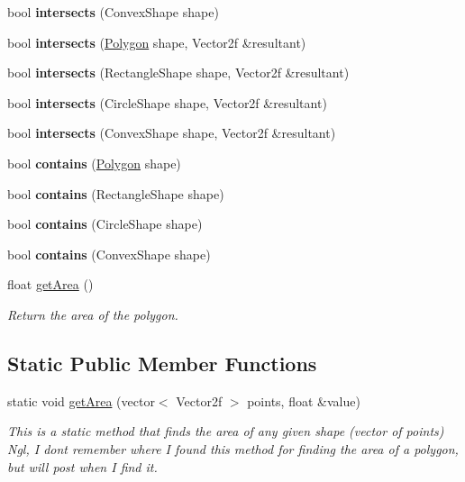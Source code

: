 \begin{DoxyCompactItemize}
bool {\bfseries intersects} (Convex\+Shape shape)
\item 
\mbox{\label{class_polygon_a713983b426b75523599e862924bca782}} 
bool {\bfseries intersects} (\mbox{\hyperlink{class_polygon}{Polygon}} shape, Vector2f \&resultant)
\item 
\mbox{\label{class_polygon_aa1af5f5482999785aed533d16279c67b}} 
bool {\bfseries intersects} (Rectangle\+Shape shape, Vector2f \&resultant)
\item 
\mbox{\label{class_polygon_a874be1c28a2a1477d1ea5d85ece74822}} 
bool {\bfseries intersects} (Circle\+Shape shape, Vector2f \&resultant)
\item 
\mbox{\label{class_polygon_ab7fb23f4dbf6277688c4fb11f0a5938f}} 
bool {\bfseries intersects} (Convex\+Shape shape, Vector2f \&resultant)
\item 
\mbox{\label{class_polygon_a1501a824c6d97ce3ef8efc5443ab1f8e}} 
bool {\bfseries contains} (\mbox{\hyperlink{class_polygon}{Polygon}} shape)
\item 
\mbox{\label{class_polygon_a1712cd82ff38472dd9ba87f0f8b37a9f}} 
bool {\bfseries contains} (Rectangle\+Shape shape)
\item 
\mbox{\label{class_polygon_a60fe86ef61eeb9903a8eef32870ea1c4}} 
bool {\bfseries contains} (Circle\+Shape shape)
\item 
\mbox{\label{class_polygon_aea5d69a1006a0b6b08dbc3e236b302ea}} 
bool {\bfseries contains} (Convex\+Shape shape)
\item 
float \mbox{\hyperlink{class_polygon_a00dc79655e7be6b73a83414a6733ec9a}{get\+Area}} ()
\begin{DoxyCompactList}\small\item\em Return the area of the polygon. \end{DoxyCompactList}\end{DoxyCompactItemize}
\subsection*{Static Public Member Functions}
\begin{DoxyCompactItemize}
\item 
static void \mbox{\hyperlink{class_polygon_a21a607cdb559f8e4a98fa54d0b9d63a9}{get\+Area}} (vector$<$ Vector2f $>$ points, float \&value)
\begin{DoxyCompactList}\small\item\em This is a static method that finds the area of any given shape (vector of points) Ngl, I don\textquotesingle{}t remember where I found this method for finding the area of a polygon, but will post when I find it. \end{DoxyCompactList}\end{DoxyCompactItemize}


